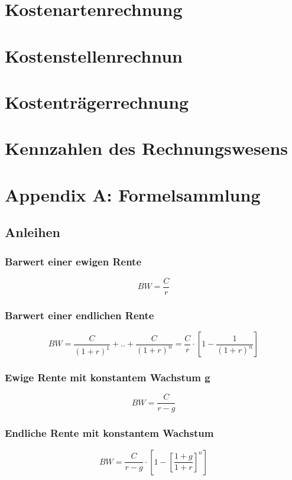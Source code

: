 \section{Kostenartenrechnung}



\section{Kostenstellenrechnun}



\section{Kostenträgerrechnung}



\section{Kennzahlen des Rechnungswesens}



\section{Appendix A: Formelsammlung}

\subsection{Anleihen}

\subsubsection{Barwert einer ewigen Rente}
\[BW = \frac{C}{r}\]

\subsubsection{Barwert einer endlichen Rente}
\[BW = \frac{C}{(1+r)^1}+..+\frac{C}{(1+r)^n} = \frac{C}{r}\cdot[1-\frac{1}{(1+r)^n}]\]

\subsubsection{Ewige Rente mit konstantem Wachstum g}
\[BW = \frac{C}{r-g}\]

\subsubsection{Endliche Rente mit konstantem Wachstum}
\[BW = \frac{C}{r-g} \cdot [1-[\frac{1+g}{1+r}]^n]\]

